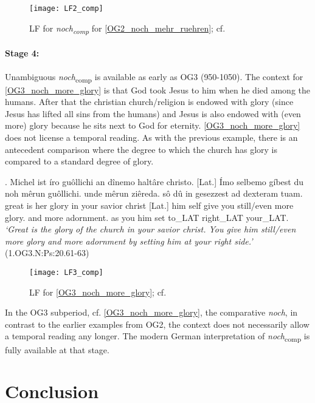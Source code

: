 \documentclass[output=paper,
modfonts
]{langscibook}
\begin{document}
\begin{figure}[H]
\texttt{[image: LF2\_comp]}
\caption{LF for \textit{noch\textsubscript{comp}} for \ref{OG2_noch_mehr_ruehren}; cf. \citep{beck2016a_sub}}
\label{fig:LF2_comp}
\end{figure}

\paragraph*{Stage 4:} Unambiguous \textit{noch}\textsubscript{comp} is available as early as OG3 (950-1050). The context for \ref{OG3_noch_more_glory} is that God took Jesus to him when he died among the humans. After that the christian church/religion is endowed with glory (since Jesus has lifted all sins from the humans) and Jesus is also endowed with (even more) glory because he sits next to God for eternity. \ref{OG3_noch_more_glory} does not license a temporal reading. As with the previous example, there is an antecedent comparison where the degree to which the church has glory is compared to a standard degree of glory.

\exg. Michel ist íro guôllichi an dînemo haltâre christo. [Lat.] Ímo selbemo gíbest du noh mêrun guôllichi. unde mêrun ziêreda. sô dû in gesezzest ad dexteram tuam.\\
great is her glory in your savior christ [Lat.] him self give you still/even more glory. and more adornment. as you him set to\_LAT right\_LAT your\_LAT.\\
\textit{`Great is the glory of the church in your savior christ. You give him still/even more glory and more adornment by setting him at your right side.'}\label{OG3_noch_more_glory} \\ \flushright \vspace{-24pt} (1.OG3.N:Ps:20.61-63)

\begin{figure}[H]
\texttt{[image: LF3\_comp]}
\caption{LF for \ref{OG3_noch_more_glory}; cf. \citep{beck2016a_sub}}
\label{fig:LF3_comp}
\end{figure}

In the OG3 subperiod, cf. \ref{OG3_noch_more_glory}, the comparative \textit{noch}, in contrast to the earlier examples from OG2, the context does not necessarily allow a temporal reading any longer. The modern German interpretation of \textit{noch}\textsubscript{comp} is fully available at that stage.

\section{Conclusion}
\end{document}
